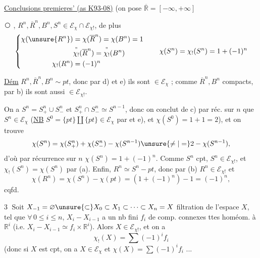 
\uline{Conclusions premieres' (as K93-08)} (on pose $\overline{\mathbb{R}}=[-\infty,+\infty]$


\textcircled{} , $R^n,\overline{R}^n,B^n,S^n\in\mathcal{E}_{\chi}\cap\mathcal{E}_{\chi!}$, de plus
\[
\left\{\begin{aligned}
\chi(\unsure{R^n})&=\chi(\overline{R}^n)=\chi(B^n)=1\\
&\overset{\text{''}}{\chi_!}(\overline{R}^n)=\overset{\text{''}}{\chi_!}(B^n)\\
\chi_!(R^n)&=(-1)^n
\end{aligned}\right.
\qquad
\chi(S^n)=\chi_!(S^n)=1+(-1)^n
\]

\uline{Dém} $R^n,\overline{R}^n,B^n\sim pt$, donc par d) et e) ils sont $\in\mathcal{E}_{\chi}$ ; comme $\overline{R}^n,B^n$ compacts, par b) ils sont aussi $\in\mathcal{E}_{\chi!}$.

On a $S^n=S^n_+\cup S^n_-$ et $S^n_+\cap S^n_-\simeq S^{n-1}$,  donc on conclut de c) par réc. sur $n$ que $S^n\in\mathcal{E}_{\chi}$ (\uline{NB} $S^0=\{pt\}\amalg\{pt\}\in\mathcal{E}_{\chi}$ par  et e), et $\chi(S^0)=1+1=2$), et on trouve
\[
\chi(S^n)=\chi(S^n_+)+\chi(S^n_-)-\chi(S^{n-1})\unsure{\ne|=}2-\chi(S^{n-1}),
\]
d'où par récurrence sur $n$ $\chi(S^n)=1+(-1)^n$. Comme $S^n$ cpt, $S^n\in\mathcal{E}_{\chi!}$, et $\chi_!(S^n)=\chi(S^n)$ par (a). Enfin, $R^n\simeq S^n-pt$, donc par (b) $R^n\in\mathcal{E}_{\chi!}$ et
\[
\chi(R^n)=\chi(S^n)-\chi(pt)=(1+(-1)^n)-1=(-1)^n,
\]
cqfd.

\textcircled{3} Soit $X_{-1}=\varnothing\unsure{\subset}X_0\subset X_1\subset\cdots\subset X_n=X$ filtration de l'espace $X$, tel que $\forall\,0\leq i\leq n$, $X_i-X_{i-1}$  a un nb fini $f_i$ de comp. connexes ttes homéom. à $\mathbb{R}^i$ (i.e. $X_i-X_{i-1}\simeq f_i\times\mathbb{R}^i$). Alors $X\in\mathcal{E}_{\chi!}$, et on a
\[
\chi_!(X)=\sum(-1)^i f_i
\]
(donc si $X$ est cpt, on a $X\in\mathcal{E}_{\chi}$ et $\chi(X)=\sum(-1)^i f_i$ ...

